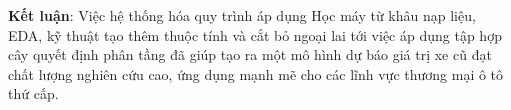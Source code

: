 \textbf{Kết luận}: Việc hệ thống hóa quy trình áp dụng Học máy từ khâu nạp liệu, EDA, kỹ thuật tạo thêm thuộc tính và cắt bỏ ngoại lai tới việc áp dụng tập hợp cây quyết định phân tầng đã giúp tạo ra một mô hình dự báo giá trị xe cũ đạt chất lượng nghiên cứu cao, ứng dụng mạnh mẽ cho các lĩnh vực thương mại ô tô thứ cấp.

